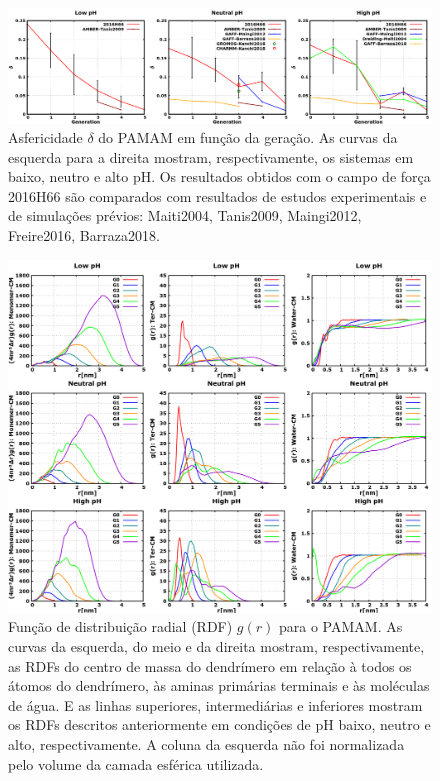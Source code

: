 \begin{figure}[ht!]
\centering
\includegraphics[width=\textwidth]{images/PME/PAMAMAsphericity.png}
\caption{Asfericidade $\delta$ do PAMAM em função da geração. As curvas da esquerda para a direita mostram, respectivamente, os sistemas em baixo, neutro e alto pH.
Os resultados obtidos com o campo de força 2016H66\cite{Horta2016} são comparados com resultados de estudos experimentais e de simulações prévios:
Maiti2004\cite{Maiti2004}, %
Tanis2009\cite{Tanis2009}, %
Maingi2012\cite{Maingi2012}, %
Freire2016\cite{Freire2016}, %
Barraza2018\cite{Barraza2018}.} %
\label{supfig:PAMAMAsphericity}
\end{figure}

\begin{figure}[ht!]
\centering
\includegraphics[width=\textwidth]{images/PME/PAMAMRDF.png}
\caption{Função de distribuição radial (RDF) $g(r)$ para o PAMAM. As curvas da esquerda, do meio e da direita mostram, respectivamente, as RDFs do centro de massa do dendrímero em relação à todos os átomos do dendrímero, às aminas primárias terminais e às moléculas de água. E as linhas superiores, intermediárias e inferiores mostram os RDFs descritos anteriormente em condições de pH baixo, neutro e alto, respectivamente. A coluna da esquerda não foi normalizada pelo volume da camada esférica utilizada.}
\label{supfig:PAMAMRDF}
\end{figure}

